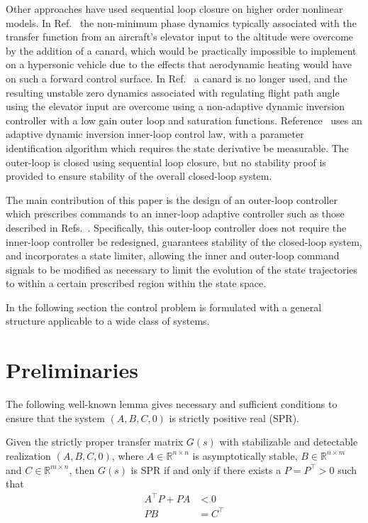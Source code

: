 \documentclass[journal]{IEEEtran}
\theoremstyle{innercustomthm}
\begin{document}
  Other approaches have used sequential loop closure on higher order nonlinear models.
  In Ref.\ \cite{fiorentini.canard.2008} the non-minimum phase dynamics typically associated with the transfer function from an aircraft's elevator input to the altitude were overcome by the addition of a canard, which would be practically impossible to implement on a hypersonic vehicle due to the effects that aerodynamic heating would have on such a forward control surface.
  In Ref.\ \cite{fiorentini.nmp.2009} a canard is no longer used, and the resulting unstable zero dynamics associated with regulating flight path angle using the elevator input are overcome using a non-adaptive dynamic inversion controller with a low gain outer loop and saturation functions.
  Reference\ \cite{bodson.autopilot.2003} uses an adaptive dynamic inversion inner-loop control law, with a parameter identification algorithm which requires the state derivative be measurable.
  The outer-loop is closed using sequential loop closure, but no stability proof is provided to ensure stability of the overall closed-loop system.

  The main contribution of this paper is the design of an outer-loop controller which prescribes commands to an inner-loop adaptive controller such as those described in Refs.\ \cite{lavretskywise.book.2013, qu.gnc.2013, wiese.adaptive.2013, wiese.gnc.2015, wiese.jgcd.2015}.
  Specifically, this outer-loop controller does not require the inner-loop controller be redesigned, guarantees stability of the closed-loop system, and incorporates a state limiter, allowing the inner and outer-loop command signals to be modified as necessary to limit the evolution of the state trajectories to within a certain prescribed region within the state space.

  In the following section the control problem is formulated with a general structure applicable to a wide class of systems.

  \section{Preliminaries}

  The following well-known lemma gives necessary and sufficient conditions to ensure that the system $(A,B,C,0)$ is strictly positive real (SPR).
  \begin{lem-dan}\label{lem.KY}
    Given the strictly proper transfer matrix $G(s)$ with stabilizable and detectable realization $(A,B,C,0)$, where $A\in\mathbb{R}^{n\times n}$ is asymptotically stable, $B\in\mathbb{R}^{n\times m}$ and $C\in\mathbb{R}^{m\times n}$, then $G(s)$ is SPR if and only if there exists a $P=P^{\top}>0$ such that
    \begin{align}
      \label{eqn.lyapal2}
      A^{\top}P+PA&<0 \\
      \label{eqn.pbc}
      PB&=C^{\top}
    \end{align}
  \end{lem-dan}
\end{document}
